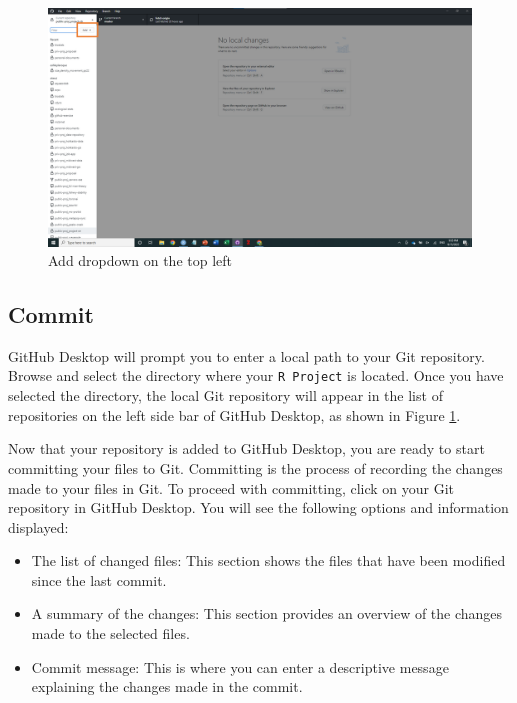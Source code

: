 \documentclass[
]{book}
\providecommand{\tightlist}{%
  \setlength{\itemsep}{0pt}\setlength{\parskip}{0pt}}
\begin{document}
\begin{figure}

{\centering \includegraphics[width=61.11in]{image/git_image03} 

}

\caption{Add dropdown on the top left}\label{fig:gitdesktop2}
\end{figure}

\hypertarget{commit}{%
\subsection{Commit}\label{commit}}

GitHub Desktop will prompt you to enter a local path to your Git repository. Browse and select the directory where your \texttt{R\ Project} is located. Once you have selected the directory, the local Git repository will appear in the list of repositories on the left side bar of GitHub Desktop, as shown in Figure \ref{fig:gitdesktop2}.

Now that your repository is added to GitHub Desktop, you are ready to start committing your files to Git. Committing is the process of recording the changes made to your files in Git. To proceed with committing, click on your Git repository in GitHub Desktop. You will see the following options and information displayed:

\begin{itemize}
\tightlist
\item
  The list of changed files: This section shows the files that have been modified since the last commit.
\item
  A summary of the changes: This section provides an overview of the changes made to the selected files.
\item
  Commit message: This is where you can enter a descriptive message explaining the changes made in the commit.
\end{itemize}
\end{document}

